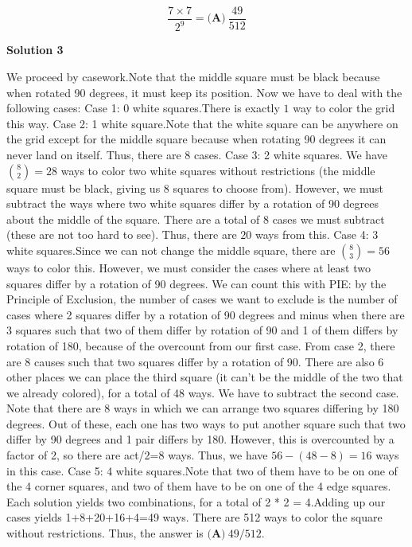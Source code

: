 \begin{enumerate}
 
 \[\frac{7\times7}{2^9}=\boxed{\textbf{(A)}\ \frac{49}{512}}\]




\textbf{Solution 3}

We proceed by casework.Note that the middle square must be black because when rotated 90 degrees, it must keep its position. Now we have to deal with the following cases: 
Case 1: 0 white squares.There is exactly $1$ way to color the grid this way. 
Case 2: 1 white square.Note that the white square can be anywhere on the grid except for the middle square because when rotating 90 degrees it can never land on itself. Thus, there are $8$ cases.
Case 3: 2 white squares. We have $\binom{8}{2}=28$ ways to color two white squares without restrictions (the middle square must be black, giving us 8 squares to choose from). However, we must subtract the ways where two white squares differ by a rotation of 90 degrees about the middle of the square. There are a total of 8 cases we must subtract (these are not too hard to see). Thus, there are $20$ ways from this.
Case 4: 3 white squares.Since we can not change the middle square, there are $\binom{8}{3}=56$ ways to color this. However, we must consider the cases where at least two squares differ by a rotation of 90 degrees. We can count this with PIE: by the Principle of Exclusion, the number of cases we want to exclude is the number of cases where 2 squares differ by a rotation of 90 degrees and minus when there are 3 squares such that two of them differ by rotation of 90 and 1 of them differs by rotation of 180, because of the overcount from our first case. From case 2, there are 8 causes such that two squares differ by a rotation of 90. There are also 6 other places we can place the third square (it can't be the middle of the two that we already colored), for a total of 48 ways. We have to subtract the second case. Note that there are 8 ways in which we can arrange two squares differing by 180 degrees. Out of these, each one has two ways to put another square such that two differ by 90 degrees and 1 pair differs by 180. However, this is overcounted by a factor of 2, so there are act/2=8 ways. Thus, we have $56-(48-8)=16$ ways in this case.
Case 5: 4 white squares.Note that two of them have to be on one of the 4 corner squares, and two of them have to be on one of the 4 edge squares. Each solution yields two combinations, for a total of 2 * 2 = 4.Adding up our cases yields 1+8+20+16+4=49 ways. There are 512 ways to color the square without restrictions. Thus, the answer is $\boxed{\textbf{(A)}\ 49/512}$.


\end{enumerate}
